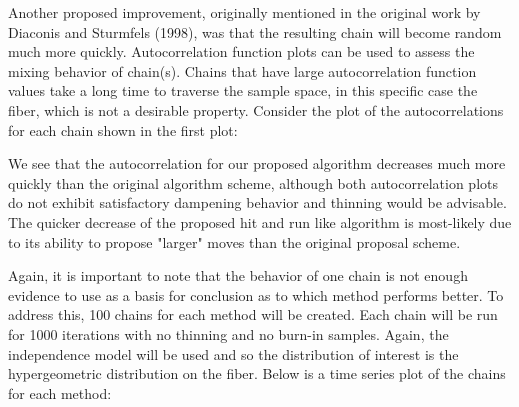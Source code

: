 \documentclass{phd}\usepackage[]{graphicx}\usepackage[]{color}
\makeatletter
\newenvironment{kframe}{%
 \def\at@end@of@kframe{}%
 \ifinner\ifhmode%
  \def\at@end@of@kframe{\end{minipage}}%
  \begin{minipage}{\columnwidth}%
 \fi\fi%
 \def\FrameCommand##1{\hskip\@totalleftmargin \hskip-\fboxsep
 \colorbox{shadecolor}{##1}\hskip-\fboxsep
     \hskip-\linewidth \hskip-\@totalleftmargin \hskip\columnwidth}%
 \MakeFramed {\advance\hsize-\width
   \@totalleftmargin\z@ \linewidth\hsize
   \@setminipage}}%
 {\par\unskip\endMakeFramed%
 \at@end@of@kframe}
\newenvironment{knitrout}{}{} %
\makeatother
\begin{document}
Another proposed improvement, originally mentioned in the original work by Diaconis and Sturmfels (1998), was that the resulting chain will become random much more quickly. Autocorrelation function plots can be used to assess the mixing behavior of chain(s). Chains that have large autocorrelation function values take a long time to traverse the sample space, in this specific case the fiber, which is not a desirable property. Consider the plot of the autocorrelations for each chain shown in the first plot:


\begin{knitrout}
\color{fgcolor}\begin{kframe}


{\ttfamily\noindent\bfseries\color{errorcolor}{\#\# Error in ggplot(data = plot\_auto\_df): object 'plot\_auto\_df' not found}}\end{kframe}
\end{knitrout}

We see that the autocorrelation for our proposed algorithm decreases much more quickly than the original algorithm scheme, although both autocorrelation plots do not exhibit satisfactory dampening behavior and thinning would be advisable. The quicker decrease of the proposed hit and run like algorithm is most-likely due to its ability to propose "larger" moves than the original proposal scheme. 

Again, it is important to note that the behavior of one chain is not enough evidence to use as a basis for conclusion as to which method performs better. To address this, 100 chains for each method will be created. Each chain will be run for 1000 iterations with no thinning and no burn-in samples. Again, the independence model will be used and so the distribution of interest is the hypergeometric distribution on the fiber. Below is a time series plot of the chains for each method:
\end{document}
